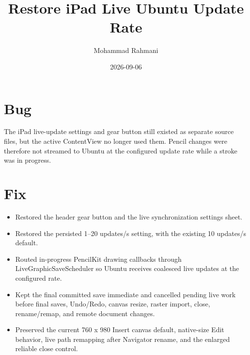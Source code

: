 \documentclass[a4paper]{article}
\title{Restore iPad Live Ubuntu Update Rate}
\date{2026-09-06}
\author{Mohammad Rahmani}
\begin{document}
   \maketitle

   \section{Bug}
   The iPad live-update settings and gear button still existed as separate
   source files, but the active ContentView no longer used them. Pencil
   changes were therefore not streamed to Ubuntu at the configured update
   rate while a stroke was in progress.

   \section{Fix}
   \begin{itemize}
      \item Restored the header gear button and the live synchronization
      settings sheet.
      \item Restored the persisted 1--20 updates/s setting, with the existing
      10 updates/s default.
      \item Routed in-progress PencilKit drawing callbacks through
      LiveGraphicSaveScheduler so Ubuntu receives coalesced live updates at
      the configured rate.
      \item Kept the final committed save immediate and cancelled pending live
      work before final saves, Undo/Redo, canvas resize, raster import, close,
      rename/remap, and remote document changes.
      \item Preserved the current 760 x 980 Insert canvas default, native-size
      Edit behavior, live path remapping after Navigator rename, and the
      enlarged reliable close control.
   \end{itemize}

   
   
\end{document}
